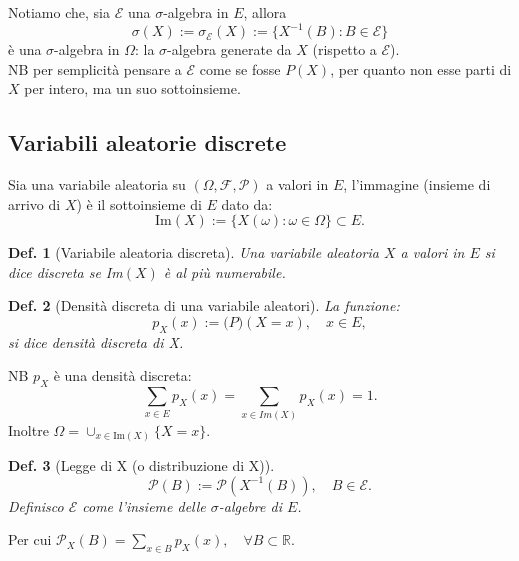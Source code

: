 \documentclass{article}
\newtheorem{definition}{Def.}[section]
\begin{document}
Notiamo che, sia $\mathcal{E}$ una $\sigma$-algebra in $E$, allora
\begin{equation}
	\sigma(X) := \sigma_\mathcal{E}(X) := \{X^{-1}(B):B\in \mathcal{E}\}
\end{equation}
è una $\sigma$-algebra in $\Omega$: la $\sigma$-algebra generate da $X$
(rispetto a $\mathcal{E}$).\\
NB per semplicità pensare a $\mathcal{E}$ come se fosse $P(X)$, per quanto non
esse parti di $X$ per intero, ma un suo sottoinsieme.

\subsection{Variabili aleatorie discrete}
Sia una variabile aleatoria su $(\Omega, \mathcal{F, P})$ a valori in $E$,
l'immagine (insieme di arrivo di $X$) è il sottoinsieme di $E$ dato da:
\begin{equation}
	\text{Im}(X) := \{ X(\omega) : \omega \in \Omega\} \subset E.
\end{equation}

\begin{definition}[Variabile aleatoria discreta]
	Una variabile aleatoria $X$ a valori in $E$ si dice discreta se Im$(X)$ è
	al più numerabile.
\end{definition}

\begin{definition}[Densità discreta di una variabile aleatori]
	La funzione:
	\begin{equation}
		p_X(x) := \mathcal(P)(X=x), \quad x \in E,
	\end{equation}
	si dice densità discreta di X.
\end{definition}

NB $p_X$ è una densità discreta:
\begin{equation}
	\sum_{x \in E}p_X(x) = \sum_{x \in Im(X)} p_X(x) = 1.
\end{equation}
Inoltre $\Omega = \cup_{x \in \text{Im}(X)}\{X = x \}$.

\begin{definition}[Legge di X (o distribuzione di X)]
\begin{equation}
	\mathcal{P}(B) := \mathcal{P}(X^{-1}(B)), \quad B \in \mathcal{E}.
\end{equation}
Definisco $\mathcal{E}$ come l'insieme delle $\sigma$-algebre di $E$.
\end{definition}

Per cui $\mathcal{P}_X(B) = \sum_{x \in B} p_X(x), \quad \forall B \subset 
\mathbb{R}$.
\end{document}
